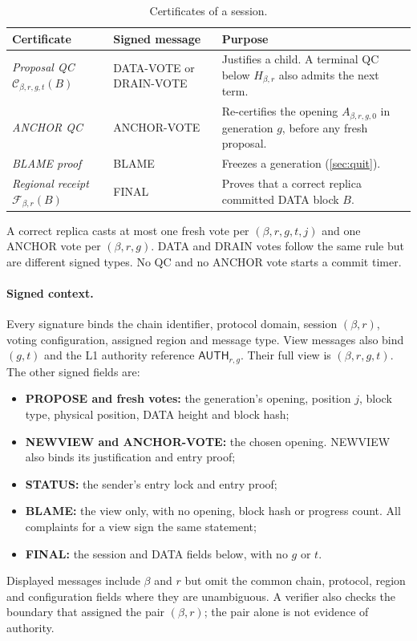 \documentclass[11pt,a4paper]{article}
\newcommand{\QC}{\mathcal C}
\newcommand{\FC}{\mathcal F}
\newcommand{\tagg}[1]{\ensuremath{\mathsf{#1}}}
\newcommand{\defterm}[1]{\textcolor{rrBlue}{\textit{#1}}}
\newcounter{protocol}
\begin{document}
\begin{table}[htbp]\centering\small
\caption{Certificates of a session.}
\label{tab:certificates}
\begin{tabularx}{\linewidth}{@{}>{\raggedright\arraybackslash}p{.25\linewidth}>{\raggedright\arraybackslash}p{.24\linewidth}Y@{}}
\toprule
Certificate & Signed message & Purpose\\
\midrule
\defterm{Proposal QC} $\QC_{\beta,r,g,t}(B)$ & DATA-VOTE or DRAIN-VOTE & Justifies a
child. A terminal QC below $H_{\beta,r}$ also admits the next term.\\
\defterm{ANCHOR QC} & ANCHOR-VOTE & Re-certifies the opening $A_{\beta,r,g,0}$ in
generation $g$, before any fresh proposal.\\
\defterm{BLAME proof} & BLAME & Freezes a generation (\cref{sec:quit}).\\
\defterm{Regional receipt} $\FC_{\beta,r}(B)$ & FINAL & Proves that a correct replica
committed DATA block $B$.\\
\bottomrule
\end{tabularx}
\end{table}

A correct replica casts at most one fresh vote per $(\beta,r,g,t,j)$ and one
ANCHOR vote per $(\beta,r,g)$. DATA and DRAIN votes follow the same rule but
are different signed types. No QC and no ANCHOR vote starts a commit
timer.

\paragraph{Signed context.}
Every signature binds the chain identifier, protocol domain, session
$(\beta,r)$, voting configuration, assigned region and message type.
View messages also bind $(g,t)$ and the L1 authority reference
$\tagg{AUTH}_{r,g}$. Their full view is $(\beta,r,g,t)$.
The other signed fields are:
\begin{itemize}
\item \textbf{PROPOSE and fresh votes:} the generation's opening,
position $j$, block type, physical position, DATA height and block hash;
\item \textbf{NEWVIEW and ANCHOR-VOTE:} the chosen opening. NEWVIEW
also binds its justification and entry proof;
\item \textbf{STATUS:} the sender's entry lock and entry proof;
\item \textbf{BLAME:} the view only, with no opening, block hash or
progress count. All complaints for a view sign the same statement;
\item \textbf{FINAL:} the session and DATA fields below, with no $g$ or $t$.
\end{itemize}
Displayed messages include $\beta$ and $r$ but omit the common chain,
protocol, region and configuration fields where they are unambiguous.
A verifier also checks the boundary that assigned the pair $(\beta,r)$;
the pair alone is not evidence of authority.
\end{document}
